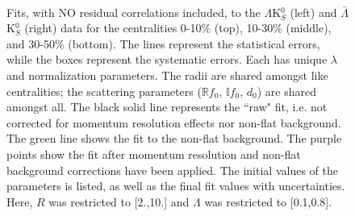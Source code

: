 \documentclass[../AnalysisNoteJBuxton.tex]{subfiles}
\begin{document}
\begin{figure}[h!]
  \centering
  \\  
  \caption[$\Lambda$K$^{0}_{S}$($\bar{\Lambda}$K$^{0}_{S}$) Fits with No Residuals]{Fits, with NO residual correlations included, to the $\Lambda$K$^{0}_{S}$ (left) and $\bar{\Lambda}$K$^{0}_{S}$ (right) data for the centralities 0-10\% (top), 10-30\% (middle), and 30-50\% (bottom).
The lines represent the statistical errors, while the boxes represent the systematic errors.
Each has unique $\lambda$ and normalization parameters.
The radii are shared amongst like centralities; the scattering parameters ($\mathbb{R}f_{0}$, $\mathbb{I}f_{0}$, $d_{0}$) are shared amongst all.
The black solid line represents the ``raw" fit, i.e. not corrected for momentum resolution effects nor non-flat background.  
The green line shows the fit to the non-flat background.
The purple points show the fit after momentum resolution and non-flat background corrections have been applied.
The initial values of the parameters is listed, as well as the final fit values with uncertainties.
Here, $R$ was restricted to [2.,10.] and $\Lambda$ was restricted to [0.1,0.8].}
  \label{fig:LamK0wConjFits_NoRes}
\end{figure}
\end{document}
